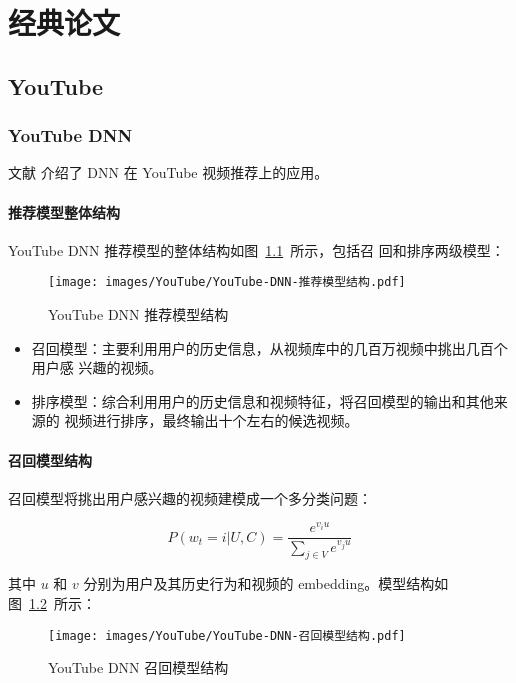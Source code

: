 \chapter{经典论文}
\section{YouTube}
\subsection{YouTube DNN}
文献  介绍了 DNN 在 YouTube 视频推荐上的应用。

\subsubsection{推荐模型整体结构}
YouTube DNN 推荐模型的整体结构如图~\ref{fig:youtube-dnn-structure}~所示，包括召
回和排序两级模型：

\begin{figure}[ht]
  \centering
  \texttt{[image: images/YouTube/YouTube-DNN-推荐模型结构.pdf]}
  \caption{YouTube DNN 推荐模型结构}\label{fig:youtube-dnn-structure}
\end{figure}

\begin{itemize}
  \item 召回模型：主要利用用户的历史信息，从视频库中的几百万视频中挑出几百个用户感
    兴趣的视频。
  \item 排序模型：综合利用用户的历史信息和视频特征，将召回模型的输出和其他来源的
    视频进行排序，最终输出十个左右的候选视频。
\end{itemize}

\subsubsection{召回模型结构}
召回模型将挑出用户感兴趣的视频建模成一个多分类问题：

\begin{equation}
  P(w_t=i|U, C) = \frac{e^{v_i u}}{\sum_{j \in V} e^{v_j u}}
\end{equation}

其中 $u$ 和 $v$ 分别为用户及其历史行为和视频的 embedding。模型结构如
图~\ref{fig:youtube-dnn-retrieval-structure}~所示：

\begin{figure}[ht]
  \centering
  \texttt{[image: images/YouTube/YouTube-DNN-召回模型结构.pdf]}
  \caption{YouTube DNN 召回模型结构}\label{fig:youtube-dnn-retrieval-structure}
\end{figure}

